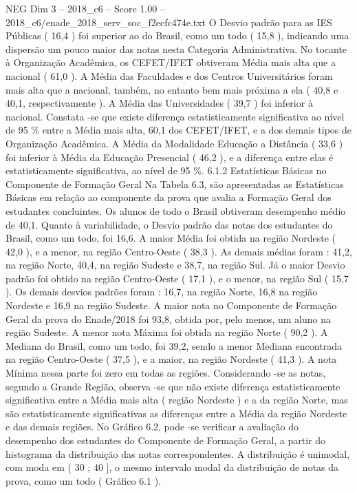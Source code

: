 \begin{textsample}{NEG Dim 3 – 2018\_c6 – Score 1.00 – 2018\_c6/enade\_2018\_serv\_soc\_f2ecfc474e.txt}
O Desvio padrão para as IES Públicas ( 16,4 ) foi superior ao do Brasil, como um todo ( 15,8 ), indicando uma dispersão um pouco maior das notas nesta Categoria Administrativa.
No tocante à Organização Acadêmica, os CEFET/IFET obtiveram Média mais alta que a nacional ( 61,0 ).
A Média das Faculdades e dos Centros Universitários foram mais alta que a nacional, também, no entanto bem mais próxima a ela ( 40,8 e 40,1, respectivamente ).
A Média das Universidades ( 39,7 ) foi inferior à nacional.
Constata -se que existe diferença estatisticamente significativa ao nível de 95 \% entre a Média mais alta, 60,1 dos CEFET/IFET, e a dos demais tipos de Organização Acadêmica.
A Média da Modalidade Educação a Distância ( 33,6 ) foi inferior à Média da Educação Presencial ( 46,2 ), e a diferença entre elas é estatisticamente significativa, ao nível de 95 \%. 6.1.2 Estatísticas Básicas no Componente de Formação Geral Na Tabela 6.3, são apresentadas as Estatísticas Básicas em relação ao componente da prova que avalia a Formação Geral dos estudantes concluintes.
Os alunos de todo o Brasil obtiveram desempenho médio de 40,1.
Quanto à variabilidade, o Desvio padrão das notas dos estudantes do Brasil, como um todo, foi 16,6.
A maior Média foi obtida na região Nordeste ( 42,0 ), e a menor, na região Centro-Oeste ( 38,3 ).
As demais médias foram : 41,2, na região Norte, 40,4, na região Sudeste e 38,7, na região Sul.
Já o maior Desvio padrão foi obtido na região Centro-Oeste ( 17,1 ), e o menor, na região Sul ( 15,7 ).
Os demais desvios padrões foram : 16,7, na região Norte, 16,8 na região Nordeste e 16,9 na região Sudeste.
A maior nota no Componente de Formação Geral da prova do Enade/2018 foi 93,8, obtida por, pelo menos, um aluno na região Sudeste.
A menor nota Máxima foi obtida na região Norte ( 90,2 ).
A Mediana do Brasil, como um todo, foi 39,2, sendo a menor Mediana encontrada na região Centro-Oeste ( 37,5 ), e a maior, na região Nordeste ( 41,3 ).
A nota Mínima nessa parte foi zero em todas as regiões.
Considerando -se as notas, segundo a Grande Região, observa -se que não existe diferença estatisticamente significativa entre a Média mais alta ( região Nordeste ) e a da região Norte, mas são estatisticamente significativas as diferenças entre a Média da região Nordeste e das demais regiões.
No Gráfico 6.2, pode -se verificar a avaliação do desempenho dos estudantes do Componente de Formação Geral, a partir do histograma da distribuição das notas correspondentes.
A distribuição é unimodal, com moda em ( 30 ; 40 ], o mesmo intervalo modal da distribuição de notas da prova, como um todo ( Gráfico 6.1 ).

\end{textsample}
